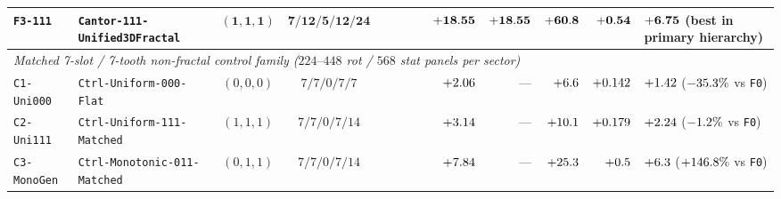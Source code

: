\begin{table}[!htbp]
{\begin{tabular}{llccrrrrrrrrl}
\textbf{\texttt{F3-111}} & \textbf{\texttt{Cantor-111-Unified3DFractal}} & $\mathbf{(1,1,1)}$ & $\mathbf{7 / 12 / 5 / 12 / 24}$ & \textbf{\roundfour{\NthreeUnithreedFoneoneoneUnifiedAreaUmtwo}} & \textbf{\roundtwo{\NthreeUnithreedFoneoneoneUnifiedPedgeUm}} & \textbf{\roundtwo{\NthreeUnithreedFoneoneoneUnifiedAswUmtwo}} & \textbf{\roundone{\NthreeUnithreedFoneoneoneUnifiedGrHarmNm}} & $\mathbf{+\roundtwo{\NthreeUnithreedFoneoneoneUnifiedFzPn}}$ & $\mathbf{+\roundtwo{\NthreeIsothreezerofournineFoneoneoneUnifiedFzPn}}$ & $\mathbf{+\roundone{\NthreeUnithreedFoneoneoneUnifiedFa}}$ & $\mathbf{+\roundthree{\NthreeUnithreedFoneoneoneUnifiedFp}}$ & $\mathbf{+\roundtwo{\NthreeUnithreedFoneoneoneUnifiedFasw}}$ (\textbf{best in primary hierarchy}) \\
\midrule
\multicolumn{13}{l}{\emph{Matched 7-slot / 7-tooth non-fractal control family ($224\text{--}448$ rot / $568$ stat panels per sector)}} \\
\texttt{C1-Uni000} & \texttt{Ctrl-Uniform-000-Flat} & $(0,0,0)$ & $7 / 7 / 0 / 7 / 7$ & \roundfour{\NthreeUnithreedCtrlUnizerozerozeroAreaUmtwo} & \roundtwo{\NthreeUnithreedCtrlUnizerozerozeroPedgeUm} & \roundtwo{\NthreeUnithreedCtrlUnizerozerozeroAswUmtwo} & \roundone{\NthreeUnithreedCtrlUnizerozerozeroGrHarmNm} & $+\roundtwo{\NthreeUnithreedCtrlUnizerozerozeroFzPn}$ & --- & $+\roundone{\NthreeUnithreedCtrlUnizerozerozeroFa}$ & $+\roundthree{\NthreeUnithreedCtrlUnizerozerozeroFp}$ & $+\roundtwo{\NthreeUnithreedCtrlUnizerozerozeroFasw}$ ($\fpeval{round(100*(\NthreeUnithreedCtrlUnizerozerozeroFzPn-\NthreeUnithreedFzerozerozeroFzPn)/\NthreeUnithreedFzerozerozeroFzPn,1)}\%$ vs \texttt{F0}) \\
\texttt{C2-Uni111} & \texttt{Ctrl-Uniform-111-Matched} & $(1,1,1)$ & $7 / 7 / 0 / 7 / 14$ & \roundfour{\NthreeUnithreedCtrlUnioneoneoneAreaUmtwo} & \roundtwo{\NthreeUnithreedCtrlUnioneoneonePedgeUm} & \roundtwo{\NthreeUnithreedCtrlUnioneoneoneAswUmtwo} & \roundone{\NthreeUnithreedCtrlUnioneoneoneGrHarmNm} & $+\roundtwo{\NthreeUnithreedCtrlUnioneoneoneFzPn}$ & --- & $+\roundone{\NthreeUnithreedCtrlUnioneoneoneFa}$ & $+\roundthree{\NthreeUnithreedCtrlUnioneoneoneFp}$ & $+\roundtwo{\NthreeUnithreedCtrlUnioneoneoneFasw}$ ($\fpeval{round(100*(\NthreeUnithreedCtrlUnioneoneoneFzPn-\NthreeUnithreedFzerozerozeroFzPn)/\NthreeUnithreedFzerozerozeroFzPn,1)}\%$ vs \texttt{F0}) \\
\texttt{C3-MonoGen} & \texttt{Ctrl-Monotonic-011-Matched} & $(0,1,1)$ & $7 / 7 / 0 / 7 / 14$ & \roundfour{\NthreeUnithreedCtrlMonogenAreaUmtwo} & \roundtwo{\NthreeUnithreedCtrlMonogenPedgeUm} & \roundtwo{\NthreeUnithreedCtrlMonogenAswUmtwo} & \roundone{\NthreeUnithreedCtrlMonogenGrHarmNm} & $+\roundtwo{\NthreeUnithreedCtrlMonogenFzPn}$ & --- & $+\roundone{\NthreeUnithreedCtrlMonogenFa}$ & $+\roundthree{\NthreeUnithreedCtrlMonogenFp}$ & $+\roundtwo{\NthreeUnithreedCtrlMonogenFasw}$ ($+\fpeval{round(100*(\NthreeUnithreedCtrlMonogenFzPn-\NthreeUnithreedFzerozerozeroFzPn)/\NthreeUnithreedFzerozerozeroFzPn,1)}\%$ vs \texttt{F0}) \\

\end{tabular}}
\end{table}

